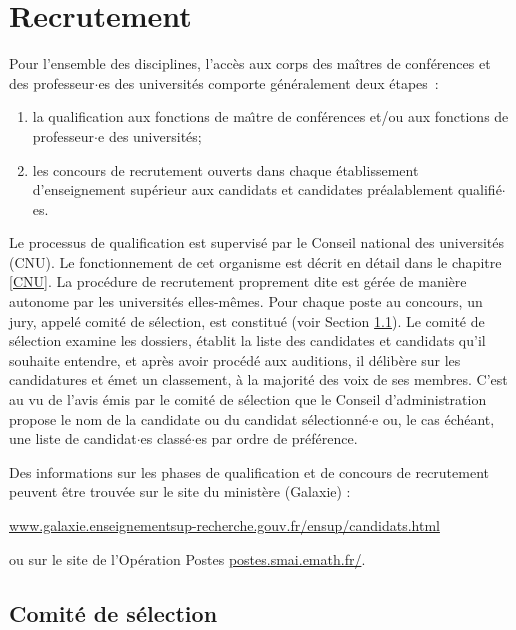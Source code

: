 \section{Recrutement}
\label{recrutement}

Pour l'ensemble des disciplines, l'acc\`es aux corps
des ma\^itres de conf\'erences et des professeur$\cdot$es des universit\'es comporte
g\'en\'eralement deux \'etapes~:
\begin{enumerate}
\item la qualification aux fonctions
de ma\^\i tre de conf\'erences et/ou aux fonctions de professeur$\cdot$e des
universit\'es;
\item les concours de recrutement ouverts dans chaque \'etablissement
d'enseignement sup\'erieur aux candidats et candidates pr\'ealablement
qualifi\'e$\cdot$es.
\end{enumerate}

Le processus de qualification est supervis\'e par le Conseil national des universit\'es (CNU).
Le fonctionnement de cet organisme est d\'ecrit en d\'etail dans le chapitre \ref{CNU}.
La proc\'edure de recrutement proprement dite est g\'er\'ee
de mani\`ere autonome par les universit\'es elles-m\^emes. Pour chaque poste au concours, un jury, appel\'e comit\'e de s\'election, est constitu\'e (voir Section \ref{sec. comiteselection}). Le comit\'e de s\'election examine les dossiers, \'etablit la liste des candidates et candidats qu'il souhaite entendre, et apr\`es avoir proc\'ed\'e aux auditions, il d\'elib\`ere sur les candidatures et \'emet un classement, \`a la majorit\'e des voix de ses membres. C'est au vu de l'avis \'emis par le comit\'e de s\'election que le Conseil d'administration propose le nom de la candidate ou du candidat s\'electionn\'e$\cdot$e ou, le cas \'ech\'eant, une liste de candidat$\cdot$es class\'e$\cdot$es par ordre de pr\'ef\'erence.

Des informations sur les phases de qualification et de concours de recrutement peuvent \^etre trouv\'ee sur le site du minist\`ere (Galaxie) :

\url{www.galaxie.enseignementsup-recherche.gouv.fr/ensup/candidats.html}

ou sur le site de l'Op\'eration Postes \url{postes.smai.emath.fr/}.



\subsection{Comit\'e de s\'election}\label{sec. comiteselection}


